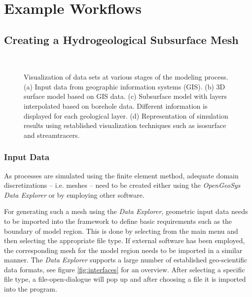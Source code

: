 \chapter{Example Workflows}

\section{Creating a Hydrogeological Subsurface Mesh}
\label{sec:dataexplorer:workflow}

\begin{figure}[!h]
\begin{center}
\enspace
{}\\
\enspace
{}
\end{center}
\caption{Visualization of data sets at various stages of the modeling process. (a) Input data from geographic information systems (GIS). (b) 3D surface model based on GIS data. (c) Subsurface model with layers interpolated based on borehole data. Different information is displayed for each geological layer. (d) Representation of simulation results using established visualization techniques such as isosurface and streamtracers.}
\label{fig:kr:vis}
\end{figure}

\subsection{Input Data}

As processes are simulated using the finite element method, adequate domain discretizations -- i.e. meshes -- need to be created either using the \emph{OpenGeoSys Data Explorer} or by employing other software.

For generating such a mesh using the \emph{Data Explorer}, geometric input data needs to be imported into the framework to define basic requirements such as the boundary of model region. This is done by selecting  from the main menu and then selecting the appropriate file type. If external software has been employed, the corresponding mesh for the model region needs to be imported in a similar manner. The \emph{Data Explorer} supports a large number of established geo-scientific data formats, see figure \ref{fig:interfaces} for an overview. After selecting a specific file type, a file-open-dialogue will pop up and after choosing a file it is imported into the program.


